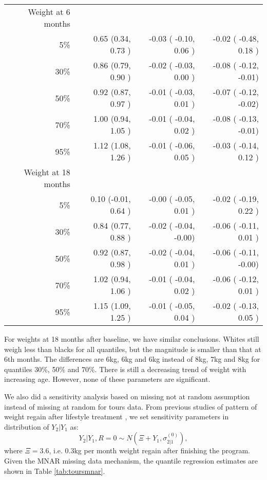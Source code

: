\documentclass[12pt]{article}
\begin{document}
\begin{table}[ht]
\begin{center}
\begin{tabular}{rrrr}
      \hline
      Weight at 6 months                                                                           \\
      5\%  & 0.65  (0.34, 0.73 )  & -0.03 ( -0.10, 0.06 ) & -0.02 ( -0.48, 0.18 )                  \\
      30\% & 0.86  (0.79, 0.90 )  & -0.02 ( -0.03, 0.00 ) & -0.08 ( -0.12, -0.01)                  \\
      50\% & 0.92  (0.87, 0.97 )  & -0.01 ( -0.03, 0.01 ) & -0.07 ( -0.12, -0.02)                  \\
      70\% & 1.00  (0.94, 1.05 )  & -0.01 ( -0.04, 0.02 ) & -0.08 ( -0.13, -0.01)                  \\
      95\% & 1.12  (1.08, 1.26 )  & -0.01 ( -0.06, 0.05 ) & -0.03 ( -0.14, 0.12 )                  \\
      Weight at 18 months                                                                          \\
      5\%  & 0.10  (-0.01, 0.64 ) & -0.00 ( -0.05, 0.01 ) & -0.02 ( -0.19, 0.22 )                  \\
      30\% & 0.84  (0.77, 0.88 )  & -0.02 ( -0.04, -0.00) & -0.06 ( -0.11, 0.01 )                  \\
      50\% & 0.92  (0.87, 0.98 )  & -0.02 ( -0.04, 0.01 ) & -0.06 ( -0.11, -0.00)                  \\
      70\% & 1.02  (0.94, 1.06 )  & -0.01 ( -0.04, 0.02 ) & -0.06 ( -0.12, 0.01 )                  \\
      95\% & 1.15  (1.09, 1.25 )  & -0.01 ( -0.05, 0.04 ) & -0.02 ( -0.13, 0.05 )                  \\
      \bottomrule
    \end{tabular}
  \end{center}
\end{table}

For weights at 18 months after baseline, we have similar
conclusions. Whites still weigh less than blacks for all quantiles,
but the magnitude is smaller than that at 6th months.  The differences
are 6kg, 6kg and 6kg instead of 8kg, 7kg and 8kg for quantiles 30\%,
50\% and 70\%. There is still a decreasing trend of weight with
increasing age.  However, none of these parameters are significant.

We also did a sensitivity analysis based on missing not at random
assumption instead of missing at random for tours data. From previous
studies of pattern of weight regain after lifestyle treatment
\citep{jeffery2000, wadden2001, wadden2005}, we set sensitivity
parameters in distribution of $Y_2|Y_1$ as:
\begin{displaymath}
  Y_2  | Y_1, R = 0 \sim N(\Xi + Y_1, \sigma_{2|1}^{(0)}),
\end{displaymath}
where $\Xi = 3.6$, i.e. 0.3kg per month weight regain after finishing
the program.  Given the MNAR missing data mechanism, the quantile
regression estimates are shown in Table \ref{tab:toursmnar}.
\end{document}
